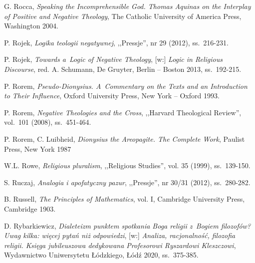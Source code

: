 \begin{thebibliography}{100}
G. Rocca, \textit{Speaking the Incomprehensible God. Thomas Aquinas on the Interplay of Positive and Negative Theology}, The Catholic University of America Press, Washington 2004.

P. Rojek, \textit{Logika teologii negatywnej}, ,,Pressje'', nr 29 (2012), ss.~216-231.


P. Rojek, \textit{Towards a~Logic of Negative Theology}, [w:] \textit{Logic in Religious Discourse}, red. A. Schumann, De Gruyter, Berlin -- Boston 2013, ss.~192-215.

P. Rorem, \textit{Pseudo-Dionysius. A~Commentary on the Texts and an Introduction to Their Influence}, Oxford University Press, New York -- Oxford 1993.

P. Rorem, \textit{Negative Theologies and the Cross}, ,,Harvard Theological Review'', vol.~101 (2008), ss.~451-464.

P. Rorem, C. Luibheid, \textit{Dionysius the Areopagite. The Complete Work}, Paulist Press, New York 1987


W.L. Rowe, \textit{Religious pluralism}, ,,Religious Studies'', vol. 35 (1999), ss.~139-150.

S. Ruczaj, \textit{Analogia i apofatyczny pazur}, ,,Pressje'', nr 30/31 (2012), ss.~280-282.

B. Russell, \textit{The Principles of Mathematics}, vol. I, Cambridge University Press, Cambridge 1903.


D. Rybarkiewicz, \textit{Dialeteizm punktem spotkania Boga religii z~Bogiem filozofów? Uwag kilka: więcej pytań niż odpowiedzi},
[w:] \textit{Analiza, racjonalność, filozofia religii. Księga jubileuszowa dedykowana Profesorowi Ryszardowi Kleszczowi}, Wydawnictwo Uniwersytetu Łódzkiego, Łódź 2020, ss.~375-385.


\end{thebibliography}
